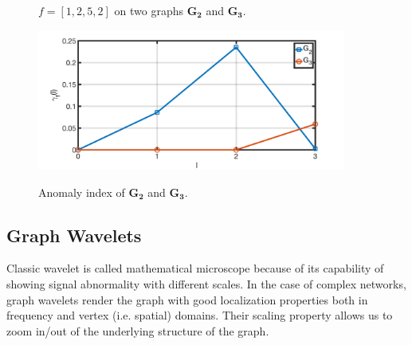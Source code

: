 \begin{figure}[t]
	\centering
	\caption{$f=[1,2,5,2]$ on two graphs $\mathbf{G_2}$ and $\mathbf{G_3}$.}
	\label{fig:f_on_g}
\end{figure}

\begin{figure}[t]
	\centering
    {
		\includegraphics[width= 4in] {figures/new_graph.png}
		\label{fig:distribution2}
	}
	\caption{Anomaly index of $\mathbf{G_2}$ and $\mathbf{G_3}$.}
	\label{fig:new_graph}
\end{figure}


\subsection{Graph Wavelets}
\label{sec:graph_wavelet}
Classic wavelet is called mathematical microscope because of its capability of showing signal abnormality with different scales.
In the case of complex networks, graph wavelets render the graph with good localization properties both in frequency and vertex (i.e. spatial) domains. Their scaling property allows us to zoom in/out of the underlying structure of the graph.

